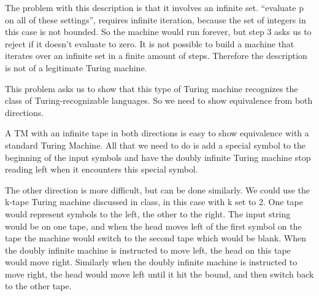 \begin{problem}{4}
  \begin{solution}
    The problem with this description is that it involves an infinite set. ``evaluate p on all of these settings'',
    requires infinite iteration, because the set of integers in this case is not bounded. So the machine would run
    forever, but step 3 asks us to reject if it doesn't evaluate to zero. It is not possible to build a machine that
    iterates over an infinite set in a finite amount of steps.  Therefore the description is not of a legitimate Turing
    machine.
  \end{solution}
\end{problem}

\begin{problem}{5}
  \begin{solution}

  \end{solution}
\end{problem}

\begin{problem}{6}
  \begin{solution}
    This problem asks us to show that this type of Turing machine recognizes the class of Turing-recognizable languages.
    So we need to show equivalence from both directions.

    A TM with an infinite tape in both directions is easy to show equivalence with a standard Turing Machine.  All that
    we need to do is add a special symbol to the beginning of the input symbols and have the doubly infinite Turing
    machine stop reading left when it encounters this special symbol.

    The other direction is more difficult, but can be done similarly.  We could use the k-tape Turing machine discussed
    in class, in this case with k set to 2.  One tape would represent symbols to the left, the other to the right. The
    input string would be on one tape, and when the head moves left of the first symbol on the tape the machine would
    switch to the second tape which would be blank. When the doubly infinite machine is instructed to move left, the
    head on this tape would move right.  Similarly when the doubly infinite machine is instructed to move right, the
    head would move left until it hit the bound, and then switch back to the other tape.
  \end{solution}
\end{problem}

\begin{problem}{7}
  \begin{solution}

  \end{solution}
\end{problem}

\begin{problem}{8}
  \begin{solution}

  \end{solution}
\end{problem}


